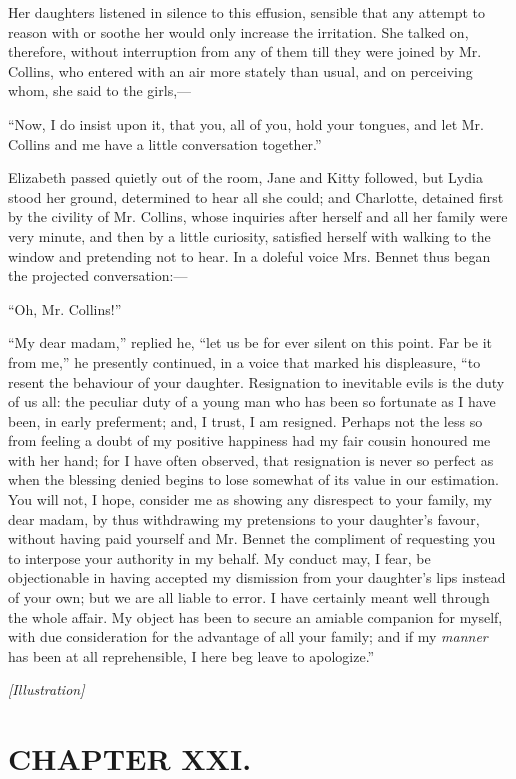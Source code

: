 \documentclass[12pt]{book}
\begin{document}
Her daughters listened in silence to this effusion, sensible that any attempt to reason with or soothe her would only increase the irritation. She talked on, therefore, without interruption from any of them till they were joined by Mr. Collins, who entered with an air more stately than usual, and on perceiving whom, she said to the girls,---

``Now, I do insist upon it, that you, all of you, hold your tongues, and let Mr. Collins and me have a little conversation together.''

Elizabeth passed quietly out of the room, Jane and Kitty followed, but Lydia stood her ground, determined to hear all she could; and Charlotte, detained first by the civility of Mr. Collins, whose inquiries after herself and all her family were very minute, and then by a little curiosity, satisfied herself with walking to the window and pretending not to hear. In a doleful voice Mrs. Bennet thus began the projected conversation:---

``Oh, Mr. Collins!''

``My dear madam,'' replied he, ``let us be for ever silent on this point. Far be it from me,'' he presently continued, in a voice that marked his displeasure, ``to resent the behaviour of your daughter. Resignation to inevitable evils is the duty of us all: the peculiar duty of a young man who has been so fortunate as I have been, in early preferment; and, I trust, I am resigned. Perhaps not the less so from feeling a doubt of my positive happiness had my fair cousin honoured me with her hand; for I have often observed, that resignation is never so perfect as when the blessing denied begins to lose somewhat of its value in our estimation. You will not, I hope, consider me as showing any disrespect to your family, my dear madam, by thus withdrawing my pretensions to your daughter's favour, without having paid yourself and Mr. Bennet the compliment of requesting you to interpose your authority in my behalf. My conduct may, I fear, be objectionable in having accepted my dismission from your daughter's lips instead of your own; but we are all liable to error. I have certainly meant well through the whole affair. My object has been to secure an amiable companion for myself, with due consideration for the advantage of all your family; and if my \textit{manner} has been at all reprehensible, I here beg leave to apologize.''

\emph{[Illustration]}

\chapter{CHAPTER XXI.}
\end{document}
